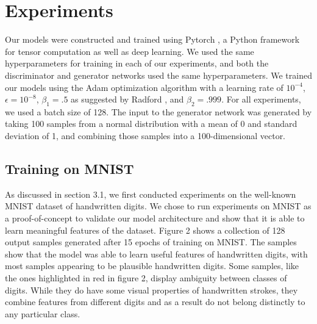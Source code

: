 \documentclass[10pt,twocolumn,letterpaper]{article}
\begin{document}
\section{Experiments}
Our models were constructed and trained using Pytorch \cite{paszke2017automatic}, a Python framework for tensor computation as well as deep learning. We used the same hyperparameters for training in each of our experiments, and both the discriminator and generator networks used the same hyperparameters. We trained our models using the Adam optimization algorithm \cite{kingma2014adam} with a learning rate of $ 10^{-4} $,  $ \epsilon = 10^{-8} $, $ \beta_{1} = .5 $ as suggested by Radford \etal \cite{radford2015unsupervised}, and $ \beta_{2} = .999 $. For all experiments, we used a batch size of 128. The input to the generator network was generated by taking 100 samples from a normal distribution with a mean of 0 and standard deviation of 1, and combining those samples into a 100-dimensional vector.

\subsection{Training on MNIST}
As discussed in section 3.1, we first conducted experiments on the well-known MNIST dataset of handwritten digits. We chose to run experiments on MNIST as a proof-of-concept to validate our model architecture and show that it is able to learn meaningful features of the dataset. Figure 2 shows a collection of 128 output samples generated after 15 epochs of training on MNIST. The samples show that the model was able to learn useful features of handwritten digits, with most samples appearing to be plausible handwritten digits. Some samples, like the ones highlighted in red in figure 2, display ambiguity between classes of digits. While they do have some visual properties of handwritten strokes, they combine features from different digits and as a result do not belong distinctly to any particular class.
\end{document}
